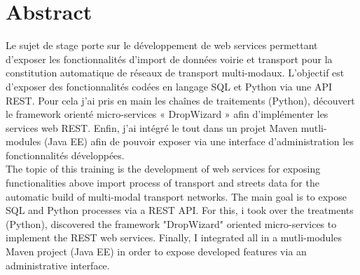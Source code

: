 \chapter*{Abstract}


Le sujet de stage porte sur le développement de web services permettant d’exposer les fonctionnalités d’import de données voirie et transport pour la constitution automatique de réseaux de transport multi-modaux. L'objectif est d'exposer des fonctionnalités codées en langage SQL et Python via une API REST. Pour cela j'ai pris en main les chaînes de traitements (Python), découvert le framework orienté micro-services « DropWizard » afin d'implémenter les services web REST. Enfin, j'ai intégré le tout dans un projet Maven mutli-modules (Java EE) afin de pouvoir exposer via une interface d'administration les fonctionnalités développées.\\

The topic of this training is the development of web services for exposing functionalities above import process of transport and streets data for the automatic build of multi-modal transport networks. The main goal is to expose SQL and Python processes via a REST API. For this, i took over the treatments  (Python), discovered the framework "DropWizard" oriented micro-services to implement the REST web services. Finally, I integrated all in a mutli-modules Maven project (Java EE) in order to expose developed features via an administrative interface.\\


